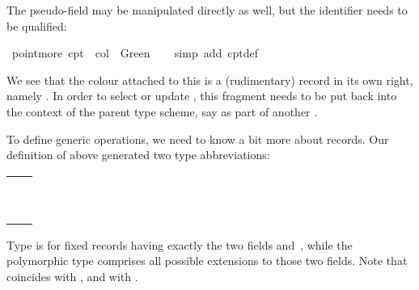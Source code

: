 \begin{isabellebody}
\begin{isamarkuptext}
  The  pseudo-field may be manipulated directly as well,
  but the identifier needs to be qualified:%
\end{isamarkuptext}%
\isamarkuptrue%
\ {\isachardoublequote}point{\isachardot}more\ cpt{}\ {\isacharequal}\ {\isasymlparr}col\ {\isacharequal}\ Green{\isasymrparr}{\isachardoublequote}\isanewline
\ \ \isamarkupfalse%
\ {\isacharparenleft}simp\ add{\isacharcolon}\ cpt{}{\isacharunderscore}def{\isacharparenright}\isamarkupfalse%
%
\begin{isamarkuptext}%
We see that the colour attached to this  is a
  (rudimentary) record in its own right, namely .  In order to select or update , this fragment
  needs to be put back into the context of the parent type scheme, say
  as  part of another .

  To define generic operations, we need to know a bit more about
  records.  Our definition of  above generated two type
  abbreviations:

  \medskip
  \begin{tabular}{l}
  \isa{point}~\isa{{\isacharequal}}~\isa{{\isasymlparr}Xcoord\ {\isacharcolon}{\isacharcolon}\ int{\isacharcomma}\ Ycoord\ {\isacharcolon}{\isacharcolon}\ int{\isasymrparr}} \\
  \isa{{\isacharprime}a\ point{\isacharunderscore}scheme}~\isa{{\isacharequal}}~\isa{{\isasymlparr}Xcoord\ {\isacharcolon}{\isacharcolon}\ int{\isacharcomma}\ Ycoord\ {\isacharcolon}{\isacharcolon}\ int{\isacharcomma}\ {\isasymdots}\ {\isacharcolon}{\isacharcolon}\ {\isacharprime}a{\isasymrparr}} \\
  \end{tabular}
  \medskip

  Type  is for fixed records having exactly the two fields
   and~, while the polymorphic type  comprises all possible extensions to those two
  fields.  Note that  coincides with , and  with .


\end{isamarkuptext}
\end{isabellebody}
